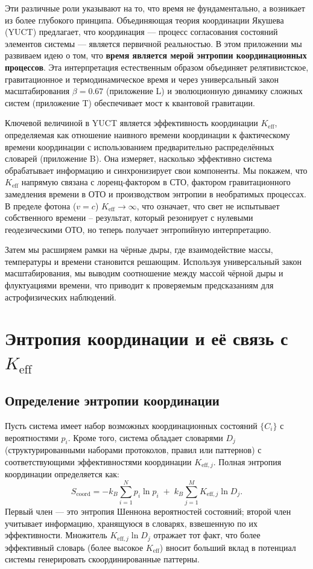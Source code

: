 \documentclass[12pt,a4paper]{article}
\newcommand{\Keff}{K_{\mathrm{eff}}}
\newcommand{\Keffi}[1]{K_{\mathrm{eff},#1}}
\newcommand{\Scoord}{S_{\mathrm{coord}}}
\begin{document}
	Эти различные роли указывают на то, что время не фундаментально, а возникает из более глубокого принципа. Объединяющая теория координации Якушева (YUCT) предлагает, что координация — процесс согласования состояний элементов системы — является первичной реальностью. В этом приложении мы развиваем идею о том, что \textbf{время является мерой энтропии координационных процессов}. Эта интерпретация естественным образом объединяет релятивистское, гравитационное и термодинамическое время и через универсальный закон масштабирования \(\beta = 0.67\) (приложение L) и эволюционную динамику сложных систем (приложение T) обеспечивает мост к квантовой гравитации.
	
	Ключевой величиной в YUCT является эффективность координации \(\Keff\), определяемая как отношение наивного времени координации к фактическому времени координации с использованием предварительно распределённых словарей (приложение B). Она измеряет, насколько эффективно система обрабатывает информацию и синхронизирует свои компоненты. Мы покажем, что \(\Keff\) напрямую связана с лоренц-фактором в СТО, фактором гравитационного замедления времени в ОТО и производством энтропии в необратимых процессах. В пределе фотона (\(v=c\)) \(\Keff \to \infty\), что означает, что свет не испытывает собственного времени – результат, который резонирует с нулевыми геодезическими ОТО, но теперь получает энтропийную интерпретацию.
	
	Затем мы расширяем рамки на чёрные дыры, где взаимодействие массы, температуры и времени становится решающим. Используя универсальный закон масштабирования, мы выводим соотношение между массой чёрной дыры и флуктуациями времени, что приводит к проверяемым предсказаниям для астрофизических наблюдений.
	
	\section{Энтропия координации и её связь с \(\Keff\)}
	\label{sec:coord_entropy}
	
	\subsection{Определение энтропии координации}
	
	Пусть система имеет набор возможных координационных состояний \(\{C_i\}\) с вероятностями \(p_i\). Кроме того, система обладает словарями \(D_j\) (структурированными наборами протоколов, правил или паттернов) с соответствующими эффективностями координации \(\Keffi{j}\). Полная энтропия координации определяется как:
	\begin{equation}
		\Scoord = -k_B \sum_{i=1}^{N} p_i \ln p_i \;+\; k_B \sum_{j=1}^{M} \Keffi{j} \ln D_j.
		\label{eq:coord_entropy_def}
	\end{equation}
	Первый член — это энтропия Шеннона вероятностей состояний; второй член учитывает информацию, хранящуюся в словарях, взвешенную по их эффективности. Множитель \(\Keffi{j} \ln D_j\) отражает тот факт, что более эффективный словарь (более высокое \(\Keff\)) вносит больший вклад в потенциал системы генерировать скоординированные паттерны.
	
\end{document}
